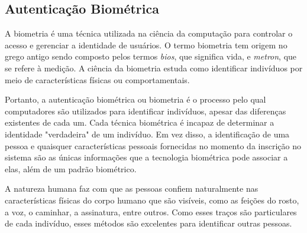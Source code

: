 \subsection{Autenticação Biométrica}
\label{subsec:autenticacao-biometrica}

A biometria é uma técnica utilizada na ciência da computação para controlar o
acesso e gerenciar a identidade de usuários.
O termo biometria tem origem no grego antigo sendo composto pelos termos \textit{bios},
que significa vida, e \textit{metron}, que se refere à medição.
A ciência da biometria estuda como identificar indivíduos por meio de
características físicas ou comportamentais\cite{idrus2013}.

Portanto, a autenticação biométrica ou biometria é o processo pelo qual
computadores
são utilizados para identificar indivíduos, apesar das diferenças existentes
de cada um.
Cada técnica biométrica é incapaz de determinar a identidade "verdadeira" de um
indivíduo.
Em vez disso, a identificação de uma pessoa e quaisquer características pessoais
fornecidas no momento da inscrição no sistema são as únicas informações que a
tecnologia biométrica pode associar a elas, além de um padrão biométrico\cite{wayman2005}.

A natureza humana faz com que as pessoas confiem naturalmente nas características
físicas do corpo humano que são visíveis, como as feições do rosto, a voz, o
caminhar,
a assinatura, entre outros.
Como esses traços são particulares de cada indivíduo, esses métodos são
excelentes para identificar outras pessoas\cite{alsaadi2015}.

